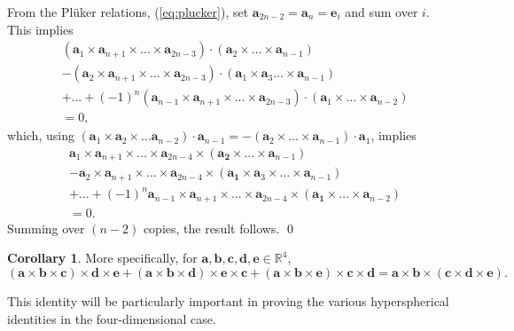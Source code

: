 \documentclass[fleqn,11pt,twoside]{article}
\makeatletter
\renewenvironment{proof}[1][\proofname]{\par
  \normalfont
  \topsep6\p@\@plus6\p@ \trivlist
  \item[\hskip\labelsep\textbf{%
    #1\@addpunct{.}}]\ignorespaces
}{%
  \qed\endtrivlist
}
\theoremstyle{definition}
\newtheorem{cor}{Corollary}
\makeatother
\begin{document}
\begin{proof}
From the Pl\"uker relations, (\ref{eq:plucker}), set $\mathbf{a}_{2n-2}=\mathbf{a}_n=\mathbf{e}_i$ and sum over $i$. This implies
\begin{equation}
\begin{split}
&(\mathbf{a}_1\times\mathbf{a}_{n+1}\times\dots\times\mathbf{a}_{2n-3})\cdot(\mathbf{a}_2\times\dots\times\mathbf{a}_{n-1})\\
&-(\mathbf{a}_2\times\mathbf{a}_{n+1}\times\dots\times\mathbf{a}_{2n-3})\cdot(\mathbf{a}_1\times\mathbf{a}_3\dots\times\mathbf{a}_{n-1})\\
&+\dots+(-1)^n(\mathbf{a}_{n-1}\times\mathbf{a}_{n+1}\times\dots\times\mathbf{a}_{2n-3})\cdot(\mathbf{a}_1\times\dots\times\mathbf{a}_{n-2})\\
&=0,
\end{split}
\end{equation}
which, using $(\mathbf{a}_1\times\mathbf{a}_2\times\dots\mathbf{a}_{n-2})\cdot\mathbf{a}_{n-1}=-(\mathbf{a}_2\times\dots\times\mathbf{a}_{n-1})\cdot\mathbf{a}_1$, implies
\begin{equation}
\begin{split}
&\mathbf{a}_1\times\mathbf{a}_{n+1}\times\dots\times\mathbf{a}_{2n-4}\times(\mathbf{a_2}\times\dots\times\mathbf{a}_{n-1})\\
&-\mathbf{a}_2\times\mathbf{a}_{n+1}\times\dots\times\mathbf{a}_{2n-4}\times(\mathbf{a_1}\times\mathbf{a}_{3}\times\dots\times\mathbf{a}_{n-1})\\
&+\dots+(-1)^n\mathbf{a}_{n-1}\times\mathbf{a}_{n+1}\times\dots\times\mathbf{a}_{2n-4}\times(\mathbf{a_1}\times\dots\times\mathbf{a}_{n-2})\\
&=0.
\end{split}
\end{equation}
Summing over $(n-2)$ copies, the result follows.
\end{proof}

\begin{cor}
More specifically, for $\mathbf{a}, \mathbf{b}, \mathbf{c}, \mathbf{d}, \mathbf{e}\in\mathbb{R}^4$,
\begin{equation}\label{9}
(\mathbf{a}\times\mathbf{b}\times\mathbf{c})\times\mathbf{d}\times\mathbf{e}+(\mathbf{a}\times\mathbf{b}\times\mathbf{d})\times\mathbf{e}\times\mathbf{c}+(\mathbf{a}\times\mathbf{b}\times\mathbf{e})\times\mathbf{c}\times\mathbf{d}=\mathbf{a}\times\mathbf{b}\times(\mathbf{c}\times\mathbf{d}\times\mathbf{e}).
\end{equation}
\end{cor}
This identity will be particularly important in proving the various hyperspherical identities in the four-dimensional case.
\end{document}
